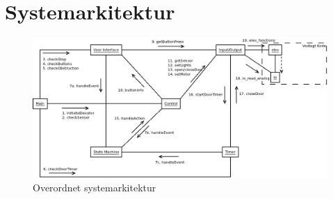 \section{Systemarkitektur}
\begin{figure}
\label{fig:sysArk}
\includegraphics[width=\textwidth]{systemarkitektur.png}
\caption{Overordnet systemarkitektur}
\end{figure}
